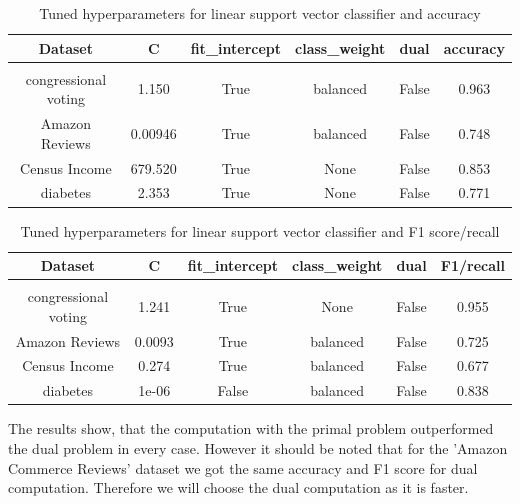 \documentclass[a4paper,12pt]{article}
\begin{document}
\begin{table}[h!]
    \centering
    \begin{tabular}{|c|c|c|c|c|c|}
    \hline
    Dataset & \textsf{C} & \textsf{fit\_intercept} &  \textsf{class\_weight} & \textsf{dual} & accuracy \\
    \hline
    \multicolumn{6}{c}{\vspace{-0.4cm}} \\ %
    \hline
    congressional voting & 1.150 & True & balanced & False & 0.963 \\%
    \hline
    Amazon Reviews & 0.00946 & True & balanced & False & 0.748 \\%
    \hline
    Census Income & 679.520 & True & None & False & 0.853 \\%
    \hline
    diabetes & 2.353 & True & None & False  & 0.771 \\%
    \hline
    \end{tabular}
    \caption{Tuned hyperparameters for linear support vector classifier and accuracy} 
    \label{table:tu_hyp_svc_ac}
    \end{table}

\begin{table}[h!]
    \centering
    \begin{tabular}{|c|c|c|c|c|c|}
    \hline
    Dataset & \textsf{C} & \textsf{fit\_intercept} &  \textsf{class\_weight} & \textsf{dual} & F1/recall \\
    \hline
    \multicolumn{6}{c}{\vspace{-0.4cm}} \\ %
    \hline
    congressional voting & 1.241 & True & None & False & 0.955 \\%
    \hline
    Amazon Reviews & 0.0093 & True & balanced & False &  0.725 \\%
    \hline
    Census Income & 0.274 & True & balanced & False & 0.677 \\%
    \hline
    diabetes & 1e-06 & False & balanced & False  & 0.838 \\%
    \hline
    \end{tabular}
    \caption{Tuned hyperparameters for linear support vector classifier and F1 score/recall} 
    \label{table:tu_hyp_svc_f1}
    \end{table}
    
The results show, that the computation with the primal problem outperformed the dual problem in every case. However it should be noted that for the 'Amazon Commerce Reviews' dataset we got the same accuracy and F1 score for dual computation. Therefore we will choose the dual computation as it is faster.
\end{document}
